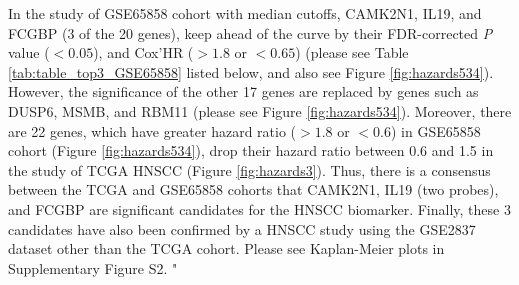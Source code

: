 \documentclass[preprint,12pt]{elsarticle}
\newenvironment{MyIndent}
{\par\leftskip1cm\relax\rightskip1cm\relax}
{\par\leftskip0cm\relax\rightskip0cm\relax}
\newenvironment{MyColorPar}[1]{%
    \leavevmode\color{#1}\ignorespaces%
}{%
}%
\begin{document}
\begin{MyColorPar}{blue}
\begin{MyIndent}
\begin{MyColorPar}{red}
In the study of GSE65858 cohort with median cutoffs, CAMK2N1, IL19, and FCGBP (3 of the 20 genes), keep ahead of the curve by their FDR-corrected \textit{P} value ($< 0.05$), and Cox'HR ($>1.8$ or $<0.65$) (please see Table \ref{tab:table_top3_GSE65858} listed below,
and also see Figure \ref{fig:hazards534}).
However, the significance of the other 17 genes are replaced by genes such as DUSP6, MSMB, and RBM11 (please see Figure \ref{fig:hazards534}).
Moreover, there are 22 genes, which have greater hazard ratio ($> 1.8$ or $< 0.6$) in GSE65858 cohort (Figure \ref{fig:hazards534}), drop their hazard ratio between 0.6 and 1.5 in the study of TCGA HNSCC (Figure \ref{fig:hazards3}).
Thus, there is a consensus between the TCGA and GSE65858 cohorts that CAMK2N1, IL19 (two probes), and FCGBP are significant candidates for the HNSCC biomarker.
Finally, these 3 candidates have also been confirmed by a HNSCC study using the GSE2837 dataset other than the TCGA cohort. Please see Kaplan-Meier plots in Supplementary Figure S2.%
"\\[0.3cm]



\end{MyColorPar}
\end{MyIndent}
\end{MyColorPar}
\end{document}
